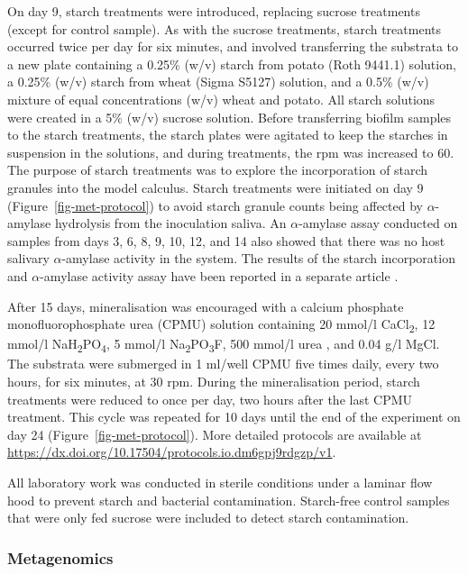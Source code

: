 \documentclass[10pt,a4paper]{article}
\begin{document}
On day 9, starch treatments were introduced, replacing sucrose
treatments (except for control sample). As with the sucrose treatments,
starch treatments occurred twice per day for six minutes, and involved
transferring the substrata to a new plate containing a 0.25\% (w/v)
starch from potato (Roth 9441.1) solution, a 0.25\% (w/v) starch from
wheat (Sigma S5127) solution, and a 0.5\% (w/v) mixture of equal
concentrations (w/v) wheat and potato. All starch solutions were created
in a 5\% (w/v) sucrose solution. Before transferring biofilm samples to
the starch treatments, the starch plates were agitated to keep the
starches in suspension in the solutions, and during treatments, the rpm
was increased to 60. The purpose of starch treatments was to explore the
incorporation of starch granules into the model calculus. Starch
treatments were initiated on day 9 (Figure~\ref{fig-met-protocol}) to
avoid starch granule counts being affected by \(\alpha\)-amylase
hydrolysis from the inoculation saliva. An \(\alpha\)-amylase assay
conducted on samples from days 3, 6, 8, 9, 10, 12, and 14 also showed
that there was no host salivary \(\alpha\)-amylase activity in the
system. The results of the starch incorporation and \(\alpha\)-amylase
activity assay have been reported in a separate article
\citep{bartholdyInvestigatingBiases2022}.

After 15 days, mineralisation was encouraged with a calcium phosphate
monofluorophosphate urea (CPMU) solution containing 20 mmol/l
CaCl\textsubscript{2}, 12 mmol/l
NaH\textsubscript{2}PO\textsubscript{4}, 5 mmol/l
Na\textsubscript{2}PO\textsubscript{3}F, 500 mmol/l urea
\citep{pearceConcomitantDeposition1987, sissonsMultistationPlaque1991},
and 0.04 g/l MgCl. The substrata were submerged in 1 ml/well CPMU five
times daily, every two hours, for six minutes, at 30 rpm. During the
mineralisation period, starch treatments were reduced to once per day,
two hours after the last CPMU treatment. This cycle was repeated for 10
days until the end of the experiment on day 24
(Figure~\ref{fig-met-protocol}). More detailed protocols are available
at \url{https://dx.doi.org/10.17504/protocols.io.dm6gpj9rdgzp/v1}.

All laboratory work was conducted in sterile conditions under a laminar
flow hood to prevent starch and bacterial contamination. Starch-free
control samples that were only fed sucrose were included to detect
starch contamination.

\subsubsection{Metagenomics}\label{metagenomics}
\end{document}
